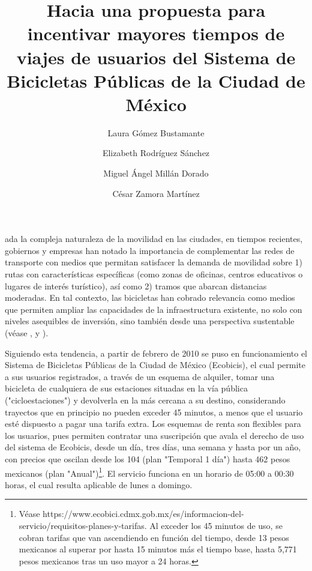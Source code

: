 \documentclass[9pt,twocolumn,twoside]{ilcss}
\title{Hacia una propuesta para incentivar mayores tiempos de viajes de usuarios del Sistema de Bicicletas Públicas de la Ciudad de México}
\author[a]{Laura Gómez Bustamante}
\author[a]{Elizabeth Rodríguez Sánchez}
\author[a]{Miguel Ángel Millán Dorado}
\author[a]{C\'esar Zamora Mart\'inez}
\affil[a]{Alumnos de Maestría en Ciencias de Datos (ITAM)}
\begin{document}
\maketitle
\thispagestyle{firststyle}


ada la compleja naturaleza de la movilidad en las ciudades, en tiempos recientes, gobiernos y empresas han notado la importancia de complementar las redes de transporte con medios que permitan satisfacer la demanda de movilidad sobre 1) rutas con características específicas (como zonas de oficinas, centros educativos o lugares de interés turístico), así como 2) tramos que abarcan distancias moderadas.  En tal contexto, las bicicletas han cobrado relevancia como medios que permiten ampliar las capacidades de la infraestructura existente, no solo con niveles asequibles de inversión, sino también desde una perspectiva sustentable (véase \cite{Fishman}, \cite{Pojani} y \cite{Stehlin}).

Siguiendo esta tendencia, a partir de febrero de 2010 se puso en funcionamiento el Sistema de Bicicletas Públicas de la Ciudad de México (Ecobicis), el cual permite a sus usuarios registrados, a través de un esquema de alquiler, tomar una bicicleta de cualquiera de sus estaciones situadas en la vía pública ("cicloestaciones") y devolverla en la más cercana a su destino, considerando trayectos que en principio no pueden exceder 45 minutos, a menos que el usuario esté dispuesto a pagar una tarifa extra. Los esquemas de renta son flexibles para los usuarios, pues permiten contratar una suscripción que avala el derecho de uso del sistema de Ecobicis, desde un día, tres días, una semana y hasta por un año, con precios que oscilan desde los 104 (plan "Temporal 1 día") hasta 462 pesos mexicanos (plan "Anual")\footnote{Véase https://www.ecobici.cdmx.gob.mx/es/informacion-del-servicio/requisitos-planes-y-tarifas. Al exceder los 45 minutos de uso, se cobran tarifas que van ascendiendo en función del tiempo, desde 13 pesos mexicanos al superar por hasta 15 minutos más el tiempo base, hasta 5,771 pesos mexicanos tras un uso mayor a 24 horas.}. El servicio funciona en un horario de 05:00 a 00:30 horas, el cual resulta aplicable de lunes a domingo.
\end{document}
